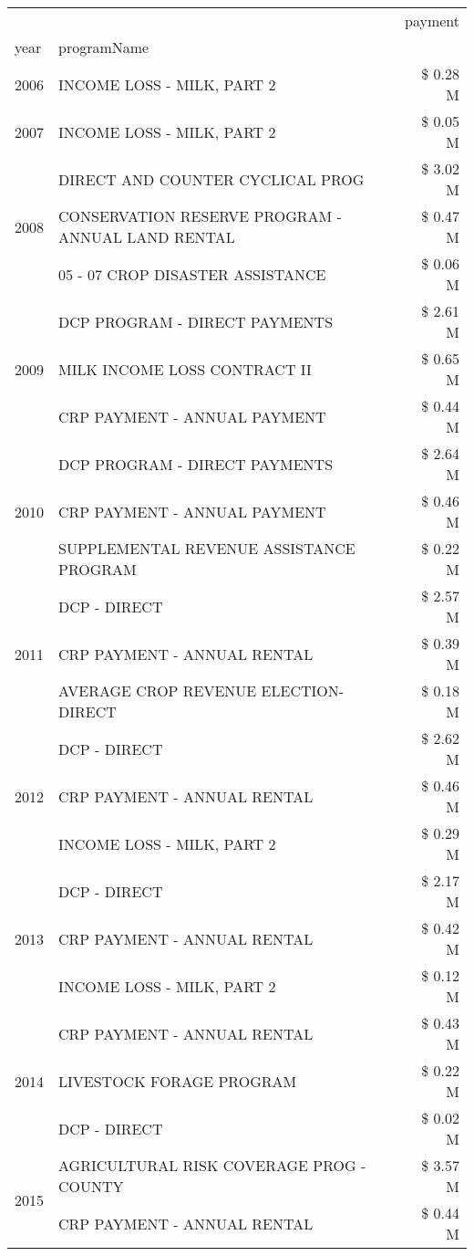 \begin{tabular}{llr}
\toprule
 &  & payment \\
year & programName &  \\
\midrule
2006 & INCOME LOSS - MILK, PART 2 & \$ 0.28 M \\
\cline{1-3}
2007 & INCOME LOSS - MILK, PART 2 & \$ 0.05 M \\
\cline{1-3}
\multirow[t]{3}{*}{2008} & DIRECT AND COUNTER CYCLICAL PROG & \$ 3.02 M \\
 & CONSERVATION RESERVE PROGRAM - ANNUAL LAND RENTAL & \$ 0.47 M \\
 & 05 - 07 CROP DISASTER ASSISTANCE & \$ 0.06 M \\
\cline{1-3}
\multirow[t]{3}{*}{2009} & DCP PROGRAM - DIRECT PAYMENTS & \$ 2.61 M \\
 & MILK INCOME LOSS CONTRACT II & \$ 0.65 M \\
 & CRP PAYMENT - ANNUAL PAYMENT & \$ 0.44 M \\
\cline{1-3}
\multirow[t]{3}{*}{2010} & DCP PROGRAM - DIRECT PAYMENTS & \$ 2.64 M \\
 & CRP PAYMENT - ANNUAL PAYMENT & \$ 0.46 M \\
 & SUPPLEMENTAL REVENUE ASSISTANCE PROGRAM & \$ 0.22 M \\
\cline{1-3}
\multirow[t]{3}{*}{2011} & DCP - DIRECT & \$ 2.57 M \\
 & CRP PAYMENT - ANNUAL RENTAL & \$ 0.39 M \\
 & AVERAGE CROP REVENUE ELECTION-DIRECT & \$ 0.18 M \\
\cline{1-3}
\multirow[t]{3}{*}{2012} & DCP - DIRECT & \$ 2.62 M \\
 & CRP PAYMENT - ANNUAL RENTAL & \$ 0.46 M \\
 & INCOME LOSS - MILK, PART 2 & \$ 0.29 M \\
\cline{1-3}
\multirow[t]{3}{*}{2013} & DCP - DIRECT & \$ 2.17 M \\
 & CRP PAYMENT - ANNUAL RENTAL & \$ 0.42 M \\
 & INCOME LOSS - MILK, PART 2 & \$ 0.12 M \\
\cline{1-3}
\multirow[t]{3}{*}{2014} & CRP PAYMENT - ANNUAL RENTAL & \$ 0.43 M \\
 & LIVESTOCK FORAGE PROGRAM & \$ 0.22 M \\
 & DCP - DIRECT & \$ 0.02 M \\
\cline{1-3}
\multirow[t]{3}{*}{2015} & AGRICULTURAL RISK COVERAGE PROG - COUNTY & \$ 3.57 M \\
 & CRP PAYMENT - ANNUAL RENTAL & \$ 0.44 M \\

\end{tabular}
